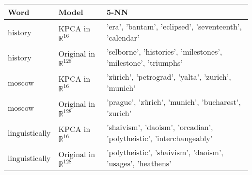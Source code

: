 \begin{table}[h]
\begin{tabular}{|l|l|l|}
\hline
\rowcolor[HTML]{C0C0C0} 
\textbf{Word}  & \textbf{Model}          & \textbf{5-NN}                                                             \\ \hline
history & KPCA in $\mathbb{R}^{16}$ & 'era', 'bantam', 'eclipsed', 'seventeenth', 'calendar' \\ \hline
history & Original in $\mathbb{R}^{128}$ & 'selborne', 'histories', 'milestones', 'milestone', 'triumphs'\\ \hline
moscow & KPCA in $\mathbb{R}^{16}$ & 'zürich', 'petrograd', 'yalta', 'zurich', 'munich' \\ \hline
moscow & Original in $\mathbb{R}^{128}$ & 'prague', 'zürich', 'munich', 'bucharest', 'zurich'\\ \hline
linguistically & KPCA in $\mathbb{R}^{16}$ & 'shaivism', 'daoism', 'orcadian', 'polytheistic', 'interchangeably'\\ \hline
linguistically & Original in $\mathbb{R}^{128}$ & 'polytheistic', 'shaivism', 'daoism', 'usages', 'heathens' \\ \hline

\end{tabular}
\end{table}
